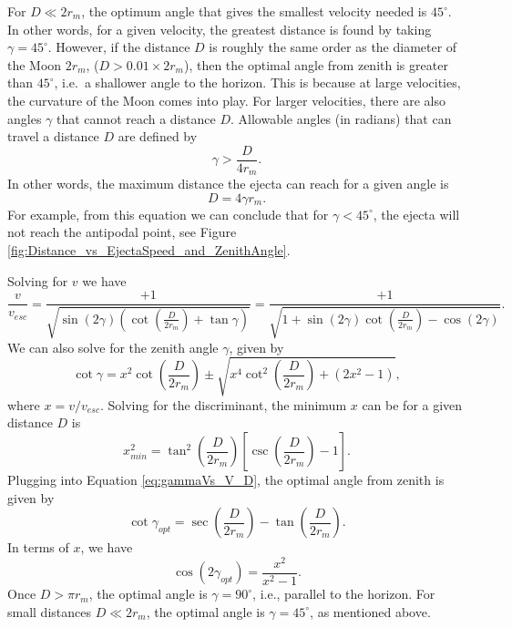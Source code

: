 \documentclass{hitec}
\begin{document}
For $D \ll 2r_m$, the optimum angle that gives the smallest velocity needed is $45^\circ$. In other words, for a given velocity, the greatest distance is found by taking $\gamma = 45^\circ$. However, if the distance $D$ is roughly the same order as the diameter of the Moon $2r_m$, ($D > 0.01\times 2r_m$), then the optimal angle from zenith is greater than $45^\circ$, i.e.\ a shallower angle to the horizon. This is because at large velocities, the curvature of the Moon comes into play. For larger velocities, there are also angles $\gamma$ that cannot reach a distance $D$. Allowable angles (in radians) that can travel a distance $D$ are defined by
\begin{equation}
\gamma > \frac{D}{4r_m}.
\end{equation}
In other words, the maximum distance the ejecta can reach for a given angle is
\begin{equation}
D = 4\gamma r_m.
\end{equation}
For example, from this equation we can conclude that for $\gamma < 45^\circ$, the ejecta will not reach the antipodal point, see Figure \ref{fig:Distance_vs_EjectaSpeed_and_ZenithAngle}.


Solving for $v$ we have
\begin{equation}\label{eq:speed_asof_distance_angle}
\frac{v}{v_{esc}} = \frac{+1}{\sqrt{\sin(2\gamma)\left(\cot\left(\frac{D}{2r_m}\right)+\tan\gamma\right)}}
= \frac{+1}{\sqrt{1+\sin(2\gamma)\cot\left(\frac{D}{2r_m}\right)-\cos(2\gamma)}}.
\end{equation}
We can also solve for the zenith angle $\gamma$, given by
\begin{equation}\label{eq:gammaVs_V_D}
\cot\gamma = x^2\cot\left(\frac{D}{2r_m}\right) \pm \sqrt{x^4\cot^2\left(\frac{D}{2r_m}\right) + (2x^2-1)},
\end{equation}
where $x = v/v_{esc}$. Solving for the discriminant, the minimum $x$ can be for a given distance $D$ is
\begin{equation}
x_{min}^2 = \tan^2\left(\frac{D}{2r_m}\right)\left[\csc\left(\frac{D}{2r_m}\right)-1\right].
\end{equation}
Plugging into Equation \ref{eq:gammaVs_V_D}, the optimal angle from zenith is given by
\begin{equation}\label{eq:opt_angle}
\cot\gamma_{opt} = \sec\left(\frac{D}{2r_m}\right) - \tan\left(\frac{D}{2r_m}\right).
\end{equation}
In terms of $x$, we have
\begin{equation}
\cos(2\gamma_{opt}) = \frac{x^2}{x^2-1}.
\end{equation}
Once $D > \pi r_m$, the optimal angle is $\gamma = 90^\circ$, i.e., parallel to the horizon. For small distances $D \ll 2r_m$, the optimal angle is $\gamma = 45^\circ$, as mentioned above.
\end{document}
